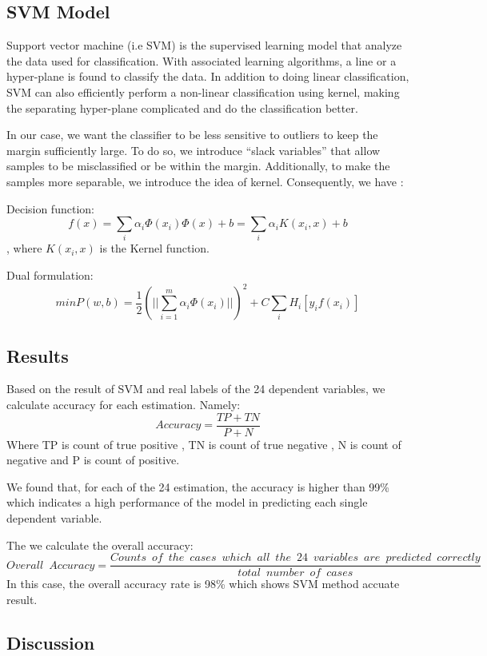 \documentclass{article}
\begin{document}
\begin{spacing}{1}
\begin{large}
\subsection{SVM Model}

Support vector machine (i.e SVM) is the supervised learning model that analyze the data used for classification. With associated learning algorithms, a line or a hyper-plane is found to classify the data. In addition to doing linear classification, SVM can also efficiently perform a non-linear classification using kernel, making the separating hyper-plane complicated and do the classification better.

In our case, we want the classifier to be less sensitive to outliers to keep the margin sufficiently large. To do so, we introduce “slack variables” that allow samples to be misclassified or be within the margin. Additionally, to make the samples more separable, we introduce the idea of kernel. Consequently, we have :

Decision function:
$$f(x) = \displaystyle\sum_{i}\alpha_i\Phi(x_i)\Phi(x)+b = \displaystyle\sum_{i}\alpha_{i} K(x_i, x)+b$$, where $K(x_i, x)$ is the Kernel function.

Dual formulation:
$$min P(w,b) = \frac{1}{2}(||\displaystyle\sum_{i=1}^{m}\alpha_i\Phi(x_i)||)^2 + C\displaystyle\sum_{i}H_{i}[y_{i}f(x_i)]$$

\subsection{Results}

Based on the result of SVM and real labels of the 24 dependent variables, we calculate accuracy for each estimation. Namely:
$$Accuracy = \frac{TP+TN}{P+N}$$
Where TP is count of true positive , TN is count of true negative , N is count of negative and P is count of positive.

We found that, for each of the 24 estimation, the accuracy is higher than 99\% which indicates a high performance of the model in predicting each single dependent variable.

The we calculate the overall accuracy:
$$Overall\enspace Accuracy = \frac{Counts\enspace of\enspace the\enspace cases\enspace which\enspace all\enspace the\enspace 24\enspace variables\enspace are\enspace predicted\enspace correctly}{total\enspace number\enspace of\enspace cases}$$
In this case, the overall accuracy rate is 98\% which shows SVM method accuate result.

\subsection{Discussion}


\end{large}
\end{spacing}
\end{document}
